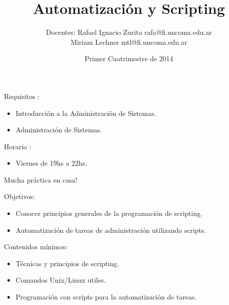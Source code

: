 \documentclass{beamer}
\title{Automatización y Scripting}
\author{Docentes: Rafael Ignacio Zurita rafa@fi.uncoma.edu.ar \\
	Miriam Lechner mtl@fi.uncoma.edu.ar }
\institute[Universities of Somewhere and Elsewhere] %
{
Tecnicatura Universitaria en Administración de Sistemas y Software Libre\\
Departamento Ingeniería de Computadoras\\
Universidad Nacional del Comahue}
\date{Primer Cuatrimestre de 2014}
\begin{document}
\begin{frame}
  \titlepage
\end{frame}








\begin{frame}{}
Requisitos : 
\begin{itemize}
\item Introducción a la Administración de Sistemas.
\item Administración de Sistemas.
\end{itemize}

\end{frame}


\begin{frame}{}
Horario : 
\begin{itemize}
\item Viernes de 19hs a 22hs.
\end{itemize}

Mucha práctica en casa!

\end{frame}


\begin{frame}{}
Objetivos: 
\begin{itemize}
\item Conocer principios generales de la programación de scripting.
\item Automatización de tareas de administración utilizando scripts.
\end{itemize}

Contenidos mínimos:

\begin{itemize}
\item Técnicas y principios de scripting.
\item Comandos Unix/Linux utiles. 
\item Programación con scripts para la automatización de tareas.
\end{itemize}

\end{frame}
\end{document}
